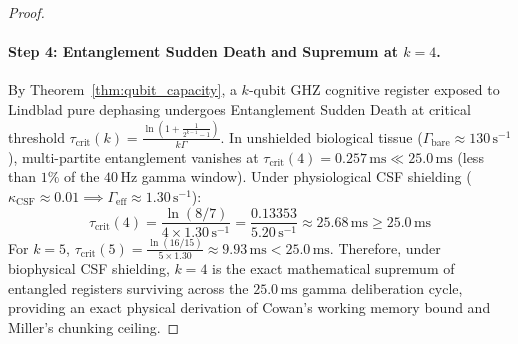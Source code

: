 \documentclass[10pt,twocolumn,3p]{article}
\begin{document}
\begin{proof}
\paragraph{Step 4: Entanglement Sudden Death and Supremum at $k=4$.}
By Theorem~\ref{thm:qubit_capacity}, a $k$-qubit GHZ cognitive register exposed to Lindblad pure dephasing undergoes Entanglement Sudden Death at critical threshold $\tau_{\text{crit}}(k) = \frac{\ln(1 + \frac{1}{2^{k-1}-1})}{k \Gamma}$. In unshielded biological tissue ($\Gamma_{\text{bare}} \approx 130\,\text{s}^{-1}$), multi-partite entanglement vanishes at $\tau_{\text{crit}}(4) = 0.257\,\text{ms} \ll 25.0\,\text{ms}$ (less than $1\%$ of the $40\,\text{Hz}$ gamma window). Under physiological CSF shielding ($\kappa_{\text{CSF}} \approx 0.01 \implies \Gamma_{\text{eff}} \approx 1.30\,\text{s}^{-1}$):
\begin{equation}
    \tau_{\text{crit}}(4) = \frac{\ln(8/7)}{4 \times 1.30\,\text{s}^{-1}} = \frac{0.13353}{5.20\,\text{s}^{-1}} \approx 25.68\,\text{ms} \ge 25.0\,\text{ms}
\end{equation}
For $k = 5$, $\tau_{\text{crit}}(5) = \frac{\ln(16/15)}{5 \times 1.30} \approx 9.93\,\text{ms} < 25.0\,\text{ms}$. Therefore, under biophysical CSF shielding, $k = 4$ is the exact mathematical supremum of entangled registers surviving across the $25.0\,\text{ms}$ gamma deliberation cycle, providing an exact physical derivation of Cowan's working memory bound and Miller's chunking ceiling.
\end{proof}
\end{document}
